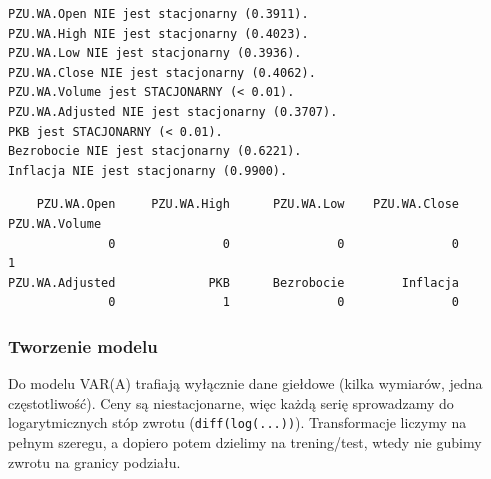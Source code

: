 \documentclass[
  polish,
  letterpaper,
  DIV=11,
  numbers=noendperiod]{scrartcl}
\begin{document}
\begin{verbatim}
PZU.WA.Open NIE jest stacjonarny (0.3911).
PZU.WA.High NIE jest stacjonarny (0.4023).
PZU.WA.Low NIE jest stacjonarny (0.3936).
PZU.WA.Close NIE jest stacjonarny (0.4062).
PZU.WA.Volume jest STACJONARNY (< 0.01).
PZU.WA.Adjusted NIE jest stacjonarny (0.3707).
PKB jest STACJONARNY (< 0.01).
Bezrobocie NIE jest stacjonarny (0.6221).
Inflacja NIE jest stacjonarny (0.9900).
\end{verbatim}

\begin{verbatim}
    PZU.WA.Open     PZU.WA.High      PZU.WA.Low    PZU.WA.Close   PZU.WA.Volume 
              0               0               0               0               1 
PZU.WA.Adjusted             PKB      Bezrobocie        Inflacja 
              0               1               0               0 
\end{verbatim}

\subsubsection{Tworzenie modelu}\label{tworzenie-modelu}

Do modelu VAR(A) trafiają wyłącznie dane giełdowe (kilka wymiarów, jedna
częstotliwość). Ceny są niestacjonarne, więc każdą serię sprowadzamy do
logarytmicznych stóp zwrotu (\texttt{diff(log(...))}). Transformacje
liczymy na pełnym szeregu, a dopiero potem dzielimy na trening/test,
wtedy nie gubimy zwrotu na granicy podziału.
\end{document}
